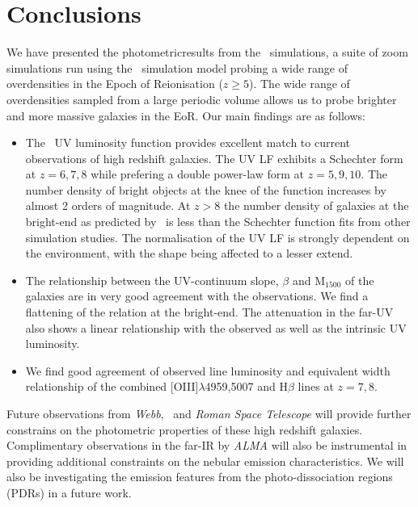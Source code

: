 \section{Conclusions}\label{sec:conc}
We have presented the photometricresults from the \flare\, simulations, a suite of zoom simulations run using the \eagle\, \citep{schaye_eagle_2015} simulation model probing a wide range of overdensities in the Epoch of Reionisation ($z\ge5$). The wide range of overdensities sampled from a large periodic volume allows us to probe brighter and more massive galaxies in the EoR. Our main findings are as follows:
\begin{itemize}
	\item The \flares\, UV luminosity function provides excellent match to current observations of high redshift galaxies. The UV LF exhibits a Schechter form at $z=6,7,8$ while prefering a double power-law form at $z=5,9,10$. The number density of bright objects at the knee of the function increases by almost 2 orders of magnitude. At $z>8$ the number density of galaxies at the bright-end as predicted by \flares\, is less than the Schechter function fits from other simulation studies. The normalisation of the UV LF is strongly dependent on the environment, with the shape being affected to a lesser extend.  
	\item The relationship between the UV-continuum slope, $\beta$ and M$_{1500}$ of the \flares\, galaxies are in very good agreement with the observations. We find a flattening of the relation at the bright-end. The attenuation in the far-UV also shows a linear relationship with the observed as well as the intrinsic UV luminosity.
	\item We find good agreement of observed line luminosity and equivalent width relationship of the combined [OIII]$\lambda$4959,5007 and H$\beta$ lines at $z=7,8$. 
\end{itemize}
Future observations from \textit{Webb}, \euclid\, and \textit{Roman Space Telescope} will provide further constrains on the photometric properties of these high redshift galaxies. Complimentary observations in the far-IR by \textit{ALMA} will also be instrumental in providing additional constraints on the nebular emission characteristics. We will also be investigating the emission features from the photo-dissociation regions (PDRs) in a future work. 